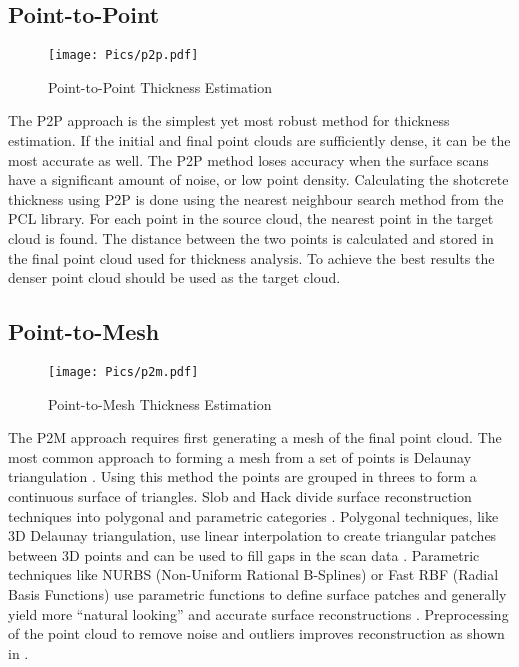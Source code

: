 \subsection{Point-to-Point}
\label{sec:p2p}
\begin{figure}[h!]
    \centering
    \texttt{[image: Pics/p2p.pdf]}
    \caption{Point-to-Point Thickness Estimation}
    \label{fig:p2pdia}
\end{figure}
The P2P approach is the simplest yet most robust method for thickness estimation. If the initial and final point clouds are sufficiently dense, it can be the most accurate as well. The P2P method loses accuracy when the surface scans have a significant amount of noise, or low point density. Calculating the shotcrete thickness using P2P is done using the nearest neighbour search method from the PCL library. For each point in the source cloud, the nearest point in the target cloud is found. The distance between the two points is calculated and stored in the final point cloud used for thickness analysis. To achieve the best results the denser point cloud should be used as the target cloud.\\
\subsection{Point-to-Mesh}
\label{sec:p2m}
\begin{figure}[h!]
    \centering
    \texttt{[image: Pics/p2m.pdf]}
    \caption{Point-to-Mesh Thickness Estimation}
    \label{fig:p2mdia}
\end{figure}

The P2M approach requires first generating a mesh of the final point cloud. The most common approach to forming a mesh from a set of points is Delaunay triangulation \cite{delaunay}. Using this method the points are grouped in threes to form a continuous surface of triangles. Slob and Hack divide surface reconstruction techniques into polygonal and parametric categories \cite{mesh1}. Polygonal techniques, like 3D Delaunay triangulation, use linear interpolation to create triangular patches between 3D points and can be used to fill gaps in the scan data \cite{mesh3}. Parametric techniques like NURBS (Non-Uniform Rational B-Splines) or Fast RBF (Radial Basis Functions) use parametric functions to define surface patches and generally yield more ``natural looking'' and accurate surface reconstructions \cite{mesh1}. Preprocessing of the point cloud to remove noise and outliers improves reconstruction as shown in \cite{mesh2}.\\

